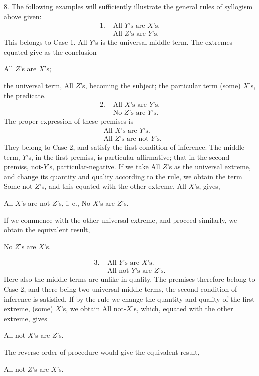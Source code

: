 \documentclass[oneside]{book}
\begin{document}
8. The following examples will sufficiently illustrate the general rules of syllogism above given:
\begin{align*}
  1. &\text{ All $Y$'s are $X$'s.}\\
     &\text{ All $Z$'s are $Y$'s.}
\end{align*}
This belongs to Case 1. All $Y$'s is the universal middle term.
The extremes equated give as the conclusion
\begin{center}
All $Z$'s are $X$'s;
\end{center}
the universal term, All $Z$'s, becoming the subject; the particular
term (some) $X$'s, the predicate.
\begin{align*}
  2. &\text{ All $X$'s are $Y$'s.}\\
     &\text{ No $Z$'s are $Y$'s.}
\end{align*}
The proper expression of these premises is
\begin{align*}
  &\text{All $X$'s are $Y$'s.}\\
  &\text{All $Z$'s are not-$Y$'s.}
\end{align*}
They belong to Case 2, and satisfy the first condition of inference.
The middle term, $Y$'s, in the first premiss, is particular-affirmative; that in the second premiss, not-$Y$'s, particular-negative.
If we take All $Z$'s as the universal extreme, and change its
quantity and quality according to the rule, we obtain the term
Some not-$Z$'s, and this equated with the other extreme, All $X$'s,
gives,
\begin{center}
  All $X$'s are not-$Z$'s, i. e., No $X$'s are $Z$'s.
\end{center}
If we commence with the other universal extreme, and proceed
similarly, we obtain the equivalent result,
\begin{center}
  No $Z$'s are $X$'s.
\end{center}

\begin{align*}
  3. &\text{ All $Y$'s are $X$'s.}\\
     &\text{ All not-$Y$'s are $Z$'s.}
\end{align*}
Here also the middle terms are unlike in quality. The premises
therefore belong to Case 2, and there being two universal middle
terms, the second condition of inference is satisfied. If by the
rule we change the quantity and quality of the first extreme,
(some) $X$'s, we obtain All not-$X$'s, which, equated with the
other extreme, gives
\begin{center}
  All not-$X$'s are $Z$'s.
\end{center}
The reverse order of procedure would give the equivalent result,
\begin{center}
  All not-$Z$'s are $X$'s.
\end{center}
\end{document}
